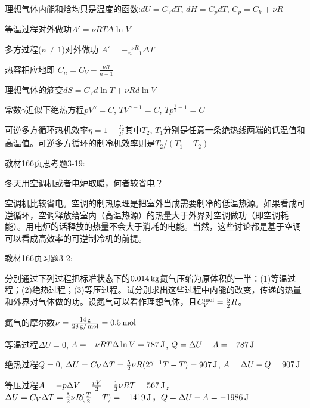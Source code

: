 \documentclass[CJK]{beamer}
\begin{document}
\begin{frame}
  \bch
  \bitem
  \item{理想气体内能和焓均只是温度的函数:$dU = C_V dT$, $dH = C_p dT$, $C_p = C_V+\nu R$}
  \item{等温过程对外做功$A'=\nu RT \Delta \ln V$}
  \item{
  多方过程($n\ne 1$)对外做功
  $A' = -\frac{\nu R}{n-1}\Delta T$
  
  热容相应地即
  $C_n = C_V - \frac{\nu R}{n-1}$}
  \item{理想气体的熵变$ dS = C_V d \ln T + \nu R d\ln V$}
  \item{常数$\gamma$近似下绝热方程$pV^\gamma = C$, $TV^{\gamma-1} =C$, $Tp^{\frac{1}{\gamma}-1} = C$}
  \item{可逆多方循环热机效率$\eta = 1- \frac{T_2}{T_1}$其中$T_2$, $T_1$分别是任意一条绝热线两端的低温值和高温值。可逆多方循环的制冷机效率则是$T_2/(T_1-T_2)$}
  \eitem
  \ech  
\end{frame}

\begin{frame}
  \chtitle{\proid  (\sthree)}
  \bch

  教材166页思考题3-19:
  
  冬天用空调机或者电炉取暖，何者较省电？


  \ech
\end{frame}


\begin{frame}
  \bch
  空调机比较省电。空调的制热原理是把室外当成需要制冷的低温热源。如果看成可逆循环，空调释放给室内（高温热源）的热量大于外界对空调做功（即空调耗能）。用电炉的话释放的热量不会大于消耗的电能。当然，这些讨论都是基于空调可以看成高效率的可逆制冷机的前提。
  \ech
\end{frame}

\begin{frame}
  \chtitle{\proid   (\stwo)}
  \bch
  教材166页习题3-2:

  分别通过下列过程把标准状态下的$0.014\,\mathrm{kg}$氮气压缩为原体积的一半：(1)等温过程；(2)绝热过程；(3)等压过程。试分别求出这些过程中内能的改变，传递的热量和外界对气体做的功。设氮气可以看作理想气体，且$C_V^{\rm mol} = \frac{5}{2}R$。
  
  \ech
\end{frame}


\begin{frame}
  \bch
  {\small
  氮气的摩尔数$\nu = \frac{14\,\mathrm{g}}{28\,\mathrm{g}/\,\mathrm{mol}} = 0.5\,\mathrm{mol}$
  \bitem
\item{等温过程$\Delta U = 0$, $A = -\nu R T\Delta \ln V = 787\,\mathrm{J}$, $Q = \Delta U - A = - 787\,\mathrm{J}$
}
\item{绝热过程$Q=0$, $\Delta U = C_V \Delta T = \frac{5}{2}\nu R (2^{\gamma-1}T -T) = 907\,\mathrm{J}$, $A = \Delta U - Q = 907\,\mathrm{J}$}
\item{等压过程$A = -p\Delta V = \frac{pV}{2} = \frac{1}{2}\nu R T = 567\,\mathrm{J}$，$\Delta U = C_V \Delta T = \frac{5}{2}\nu R (\frac{T}{2}-T) = -1419\,\mathrm{J}$，$Q = \Delta U - A = -1986 \,\mathrm{J}$}
  \eitem
  }
  \ech
\end{frame}
\end{document}
